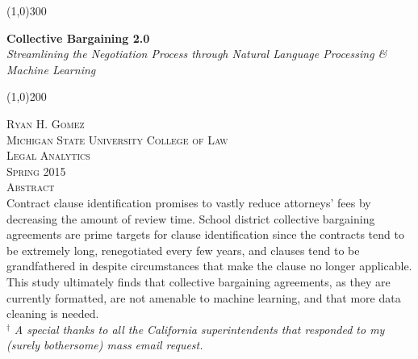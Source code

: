 \documentclass{article}
\begin{document}
\begin{titlepage}
    \begin{center}
    \line(1,0){300} \\
    [0.2in]
    \begin{flushleft}
    \huge{\bfseries{
Collective Bargaining 2.0}}\\ \Large{\textit{Streamlining the Negotiation Process through Natural Language Processing \& Machine Learning}}\\
    \end{flushleft}
    \line(1,0){200} \\
    [3.5cm]
    \end{center}
    \begin{flushleft}
    
    \textsc{\Large Ryan H. Gomez}\\
    [.5cm]
    
    \textsc{\large Michigan State University College of Law \\
    \normalsize Legal Analytics\\
    Spring 2015}\\
    [2cm]
    \textsc{\large Abstract}\\
    [.25cm]
    Contract clause identification promises to vastly reduce attorneys’ fees by decreasing the amount of review time. School district collective bargaining agreements are prime targets for clause identification since the contracts tend to be extremely long, renegotiated every few years, and clauses tend to be grandfathered in despite circumstances that make the clause no longer applicable. This study ultimately finds that collective bargaining agreements, as they are currently formatted, are not amenable to machine learning, and that more data cleaning is needed.\\
    [3.25cm]
    \small{$^\dagger$ \textit{A special thanks to all the California superintendents that responded to my (surely bothersome) mass email request.}} 
    \end{flushleft}
\end{titlepage}

\newpage




\newpage

\newpage

\newpage

\newpage

\newpage

\newpage

\end{document}
